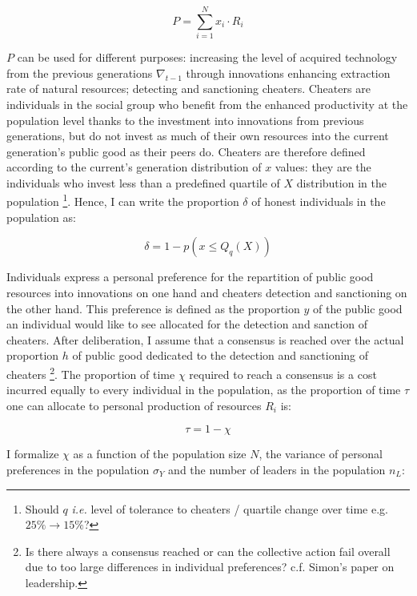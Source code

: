 \documentclass[a4paper]{article}
\begin{document}
\begin{equation} \label{eq:pubgood}
P = \sum_{i=1}^{N}x_i\cdot R_i
\end{equation}

$P$ can be used for different purposes: increasing the level of acquired technology from the previous generations $\nabla_{t-1}$ through innovations enhancing extraction rate of natural resources; detecting and sanctioning cheaters. Cheaters are individuals in the social group who benefit from the enhanced productivity at the population level thanks to the investment into innovations from previous generations, but do not invest as much of their own resources into the current generation's public good as their peers do. Cheaters are therefore defined according to the current's generation distribution of $x$ values: they are the individuals who invest less than a predefined quartile of $X$ distribution in the population \footnote{Should $q$ \textit{i.e.} level of tolerance to cheaters / quartile change over time e.g. $25\%\to15\%$?}. Hence, I can write the proportion $\delta$ of honest individuals in the population as:

\begin{equation} \label{eq:cheat}
\delta=1-p(x\le Q_q\left(X\right))
\end{equation}

Individuals express a personal preference for the repartition of public good resources into innovations on one hand and cheaters detection and sanctioning on the other hand. This preference is defined as the proportion $y$ of the public good an individual would like to see allocated for the detection and sanction of cheaters. After deliberation, I assume that a consensus is reached over the actual proportion $h$ of public good dedicated to the detection and sanctioning of cheaters \footnote{Is there always a consensus reached or can the collective action fail overall due to too large differences in individual preferences? c.f. Simon's paper on leadership.}. The proportion of time $\chi$ required to reach a consensus is a cost incurred equally to every individual in the population, as the proportion of time $\tau$ one can allocate to personal production of resources $R_i$ is: 

\begin{equation}
\tau=1-\chi
\end{equation}

I formalize $\chi$ as a function of the population size $N$, the variance of personal preferences in the population $\sigma_Y$ and the number of leaders in the population $n_L$:
\end{document}
